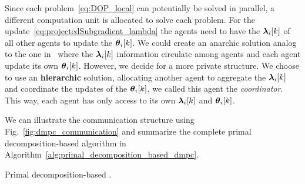 \documentclass[../main.tex]{subfiles}
\begin{document}
Since each problem~\eqref{eq:DOP_local} can potentially be solved in parallel, a different computation unit is allocated to solve each problem.
For the update~\eqref{eq:projectedSubgradient_lambda} the agents need to have the $\lambdaik$ of all other agents to update the $\thetaik$.
We could create an anarchic solution analog to the one in~\cite{VelardeEtAl2018} where the $\lambdaik$ information circulate among agents and each agent update its own $\thetaik$.
However, we decide for a more private structure.
We choose to use an \textbf{hierarchic} solution, allocating another agent to aggregate the $\lambdaik$ and coordinate the updates of the $\thetaik$, we called this agent the \emph{coordinator}.
This way, each agent has only access to its own $\lambdaik$ and $\thetaik$.

We can illustrate the communication structure using Fig.~\ref{fig:dmpc_communication} and summarize the complete primal decomposition-based \dmpc{} algorithm in Algorithm~\ref{alg:primal_decomposition_based_dmpc}.

\begin{algorithm2e}[h]
  \DontPrintSemicolon%
  \caption{Primal decomposition-based \dmpc{}.}\label{alg:primal_decomposition_based_dmpc}
\end{algorithm2e}
\end{document}
